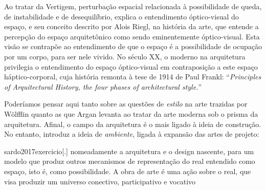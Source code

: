 Ao tratar da Vertigem, perturbação espacial relacionada à possibilidade
de queda, de instabilidade e de desequilíbrio, explica o entendimento
óptico-visual do espaço, e seu conceito descrito por Alois Riegl, na
história da arte, que entende a percepção do espaço arquitetônico como
sendo eminentemente óptico-visual. Esta visão se contrapõe ao
entendimento de que o espaço é a possibilidade de ocupação por um
corpo, para ser nele vivido. No século XX, o moderno na arquitetura
privilegia o entendimento do espaço óptico-visual em contraposição a
este espaço háptico-corporal, cuja história remonta à tese de 1914 de
Paul Frankl: \enquote{\emph{Principles of Arquitectural History, the
		four phases of architectural style.}}

Poderíamos pensar aqui tanto sobre as questões de \emph{estilo} na arte
trazidas por Wölfflin quanto as que Argan levanta ao tratar da arte
moderna sob o prisma da arquitetura. Afinal, o campo da arquitetura é o
mais ligado à ideia de construção. No entanto,
\textcite{sardo2017exercicio} introduz a ideia de \emph{ambiente},
ligada à expansão das artes de projeto:

\begin{displaycquote}[206]{sardo2017exercicio}[.]
	\textelp{} nomeadamente a arquitetura e o design nascente, para um modelo que
	produz outros mecanismos de representação do real entendido como espaço,
	isto é, como possibilidade. A obra de arte é uma ação sobre o real, que
	visa produzir um universo conectivo, participativo e vocativo
\end{displaycquote}


